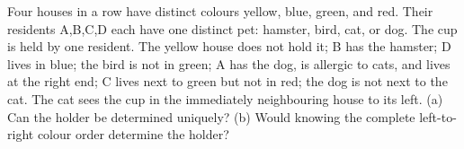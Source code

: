 Four houses in a row have distinct colours yellow, blue, green, and red. Their residents A,B,C,D each have one distinct pet: hamster, bird, cat, or dog. The cup is held by one resident. The yellow house does not hold it; B has the hamster; D lives in blue; the bird is not in green; A has the dog, is allergic to cats, and lives at the right end; C lives next to green but not in red; the dog is not next to the cat. The cat sees the cup in the immediately neighbouring house to its left. (a) Can the holder be determined uniquely? (b) Would knowing the complete left-to-right colour order determine the holder?
